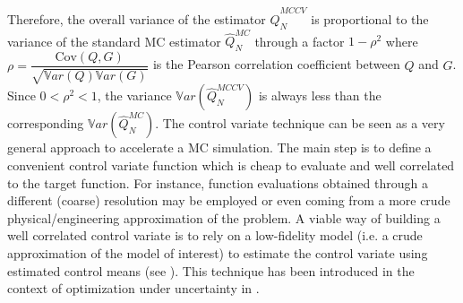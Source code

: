 Therefore, the overall variance of the estimator $\hat{Q}_N^{MCCV}$ is proportional to the variance of the standard
MC estimator $\hat{Q}_N^{MC}$ through a factor $1-\rho^2$ where $\rho = \dfrac{ \mathrm{Cov}\left(Q,G\right) }{\sqrt{\mathbb{V}ar\left(Q\right)\mathbb{V}ar\left(G\right)}}$ is the Pearson
correlation coefficient between $Q$ and $G$. Since $0<\rho^2<1$, the variance $\mathbb{V}ar\left( \hat{Q}_N^{MCCV} \right)$ is always less than
the corresponding $\mathbb{V}ar\left({\hat{Q}_N^{MC}}\right)$. The control variate technique can be seen as a very general approach
to accelerate a MC simulation. The main step is to define a convenient control variate function which is cheap to evaluate and well correlated 
to the target function. For instance, function evaluations obtained through a different (coarse) resolution may be employed or even coming 
from a more crude physical/engineering approximation of the problem. A viable way of building a well correlated control variate is to 
rely on a low-fidelity model (i.e. a crude approximation of the model of interest) to estimate the control variate using estimated 
control means (see \cite{Pasupathy2014}). This technique has been introduced in the context of optimization under uncertainty in \cite{Ng2014}.

